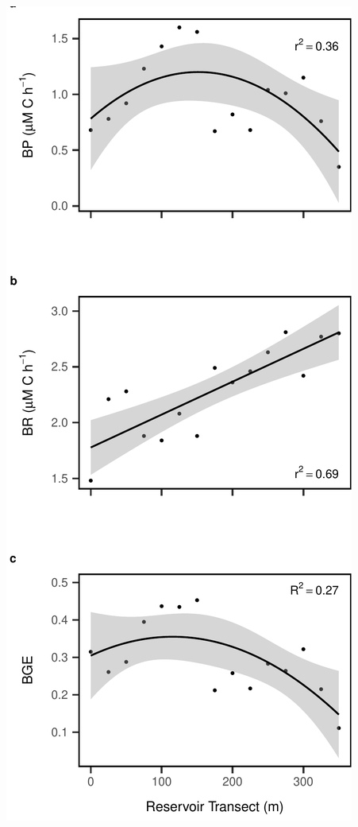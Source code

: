 \documentclass[]{article}
\begin{document}
\begin{center}\includegraphics{ReservoirGradient_files/figure-latex/metab_plot-1} \end{center}
\end{document}
